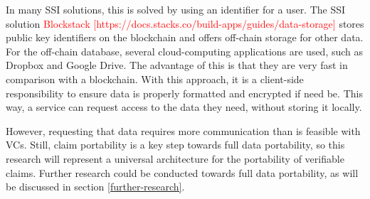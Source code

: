 In many SSI solutions, this is solved by using an identifier for a user. The SSI solution \textcolor{red}{Blockstack [https://docs.stacks.co/build-apps/guides/data-storage]} stores public key identifiers on the blockchain and offers off-chain storage for other data. For the off-chain database, several cloud-computing applications are used, such as Dropbox and Google Drive. The advantage of this is that they are very fast in comparison with a blockchain. With this approach, it is a client-side responsibility to ensure data is properly formatted and encrypted if need be. This way, a service can request access to the data they need, without storing it locally. 

However, requesting that data requires more communication than is feasible with VCs. Still, claim portability is a key step towards full data portability, so this research will represent a universal architecture for the portability of verifiable claims. Further research could be conducted towards full data portability, as will be discussed in section \ref{further-research}.

